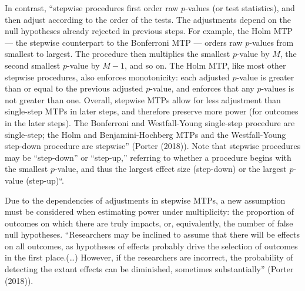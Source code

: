 \documentclass[
]{article}
\begin{document}
In contrast, ``stepwise procedures first order raw \(p\)-values (or test
statistics), and then adjust according to the order of the tests. The
adjustments depend on the null hypotheses already rejected in previous
steps. For example, the Holm MTP --- the stepwise counterpart to the
Bonferroni MTP --- orders raw \(p\)-values from smallest to largest. The
procedure then multiplies the smallest \(p\)-value by \(M\), the second
smallest \(p\)-value by \(M-1\), and so on. The Holm MTP, like most
other stepwise procedures, also enforces monotonicity: each adjusted
\(p\)-value is greater than or equal to the previous adjusted
\(p\)-value, and enforces that any \(p\)-values is not greater than one.
Overall, stepwise MTPs allow for less adjustment than single-step MTPs
in later steps, and therefore preserve more power (for outcomes in the
later steps). The Bonferroni and Westfall-Young single-step procedure
are single-step; the Holm and Benjamini-Hochberg MTPs and the
Westfall-Young step-down procedure are stepwise'' (Porter (2018)). Note
that stepwise procedures may be ``step-down'' or ``step-up,'' referring
to whether a procedure begins with the smallest \(p\)-value, and thus
the largest effect size (step-down) or the largest \(p\)-value
(step-up)``.

Due to the dependencies of adjustments in stepwise MTPs, a new
assumption must be considered when estimating power under multiplicity:
the proportion of outcomes on which there are truly impacts, or,
equivalently, the number of false null hypotheses. ``Researchers may be
inclined to assume that there will be effects on all outcomes, as
hypotheses of effects probably drive the selection of outcomes in the
first place.(\ldots) However, if the researchers are incorrect, the
probability of detecting the extant effects can be diminished, sometimes
substantially'' (Porter (2018)).
\end{document}
